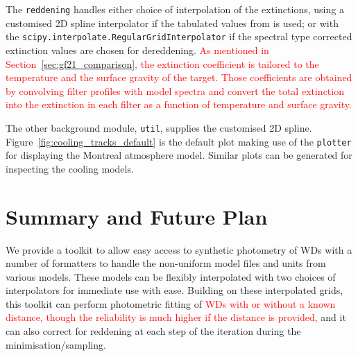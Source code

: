 \documentclass[fleqn,usenatbib]{rasti}
\begin{document}
The \texttt{reddening} handles either choice of interpolation of the
extinctions, using a customised 2D spline interpolator if the tabulated values
from \citet{2011ApJ...737..103S} is used; or with the
\verb+scipy.interpolate.RegularGridInterpolator+ if the spectral type corrected
extinction values are chosen for dereddening. \textcolor{red}{As mentioned in
Section~\ref{sec:gf21_comparison}, the extinction coefficient is tailored to the
temperature and the surface gravity of the target. Those coefficients are
obtained by convolving filter profiles with model spectra and convert the
total extinction into the extinction in each filter as a function of
temperature and surface gravity.}

The other background module, \texttt{util}, supplies the customised 2D spline.
Figure~\ref{fig:cooling_tracks_default} is the default plot making use of the
\texttt{plotter} for displaying the Montreal atmosphere model. Similar
plots can be generated for inspecting the cooling models.

\section{Summary and Future Plan}
We provide a toolkit to allow easy access to synthetic photometry of WDs with
a number of formatters to handle the non-uniform model files and units from
various models. These models can be flexibly interpolated with two choices of
interpolators for immediate use with ease. Building on these interpolated
grids, this toolkit can perform photometric fitting of \textcolor{red}{WDs with
or without a known distance, though the reliability is much higher if the distance is provided,} and
it can also correct for reddening at each step of the iteration during the
minimisation/sampling.
\end{document}
